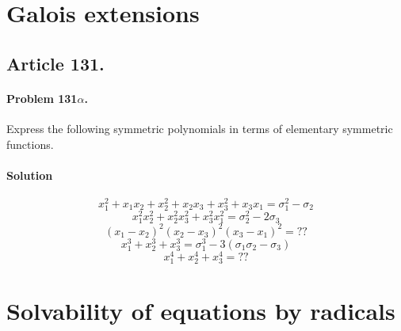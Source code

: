 \section{Galois extensions}

\subsection{Article 131.}

\paragraph{Problem 131$\alpha$.}
Express the following symmetric polynomials in terms of elementary
symmetric functions.

\paragraph*{Solution}

$$x_1^2 + x_1 x_2 + x_2^2 + x_2 x_3 + x_3^2 + x_3 x_1 = \sigma_1^2 - \sigma_2$$
$$x_1^2 x_2^2 + x_2^2 x_3^2 + x_3^2 x_1^2 = \sigma_2^2 - 2\sigma_3$$
$$(x_1-x_2)^2 (x_2-x_3)^2 (x_3-x_1)^2 = ??$$
$$x_1^3 + x_2^3 + x_3^3 = \sigma_1^3 - 3(\sigma_1 \sigma_2 - \sigma_3)$$
$$x_1^4 + x_2^4 + x_3^4 = ??$$


\section{Solvability of equations by radicals}

